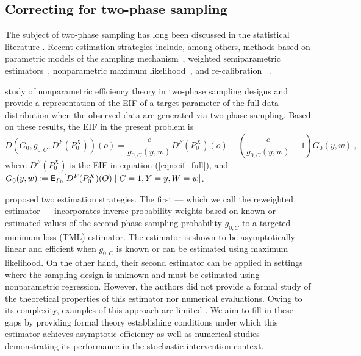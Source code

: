 \subsection{Correcting for two-phase sampling}\label{samp_lit}

The subject of two-phase sampling has long been discussed in the statistical
literature \citep{neyman1938contribution,manski1977estimation,white1982two}.
Recent estimation strategies include, among others, methods based on parametric
models of the sampling mechanism~\citep{breslow1988logistic}, weighted
semiparametric estimators~\citep{robins1994estimation}, nonparametric maximum
likelihood~\citep{breslow2003large}, and re-calibration
~\citep{fong2015calibration}.

\citet{rose2011targeted2sd} study of nonparametric efficiency theory in
two-phase sampling designs and provide a representation of the EIF of a target
parameter of the full data distribution when the observed data are generated via
two-phase sampling. Based on these results, the EIF in the present problem is
\begin{equation}\label{eqn:eif_obs}
  D(G_0, g_{0,C}, D^F(P_0^X))(o) = \frac{c}{g_{0,C}(y, w)} D^F(P_0^X)(o) -
  \left(\frac{c}{g_{0,C}(y,w)} - 1 \right) G_0(y,w) \ ,
\end{equation}
where $D^F(P_0^X)$ is the EIF in equation (\ref{eqn:eif_full}), and $G_0(y,w)
\coloneqq \mathsf{E}_{P_0} [D^F(P_0^X)(O) \mid C = 1, Y = y, W = w]$.

\citet{rose2011targeted2sd} proposed two estimation strategies. The first ---
which we call the reweighted estimator --- incorporates inverse probability
weights based on known or estimated values of the second-phase sampling
probability $g_{0,C}$ to a targeted minimum loss (TML) estimator. The estimator
is shown to be asymptotically linear and efficient when $g_{0,C}$ is known or
can be estimated using maximum likelihood. On the other hand, their second
estimator can be applied in settings where the sampling design is unknown and
must be estimated using nonparametric regression. However, the authors did not
provide a formal study of the theoretical properties of this estimator nor
numerical evaluations. Owing to its complexity, examples of this approach are
limited \citep[e.g.,][]{brown2014applications}. We aim to fill in these gaps by
providing formal theory establishing conditions under which this estimator
achieves asymptotic efficiency as well as numerical studies demonstrating its
performance in the stochastic intervention context.

